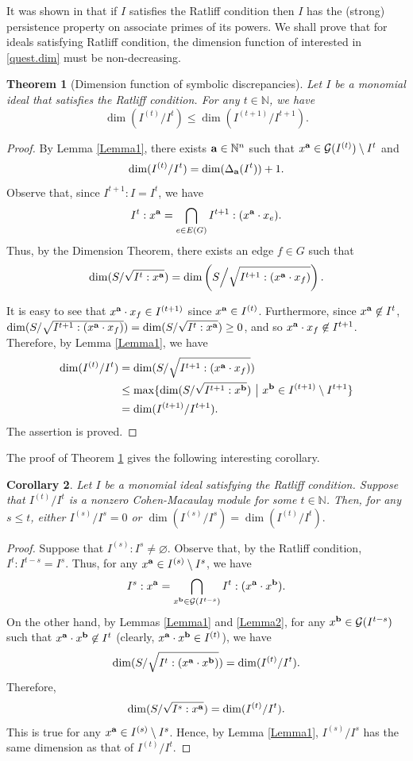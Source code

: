 \documentclass[12pt]{amsart}
\numberwithin{equation}{section}
\newtheorem{theorem}{Theorem}[section]
\newtheorem{corollary}[theorem]{Corollary}
\theoremstyle{definition}
\theoremstyle{definition}
\newcommand{\NN}{{\mathbb N}}
\def\a{{\bold a}}
\def\b{{\bold b}}
\def\G{\mathcal{G}}
\begin{document}
It was shown in \cite{HQ2014} that if $I$ satisfies the Ratliff condition then $I$ has the (strong) persistence property on associate primes of its powers. We shall prove that for ideals satisfying Ratliff condition, the dimension function of interested in \ref{quest.dim} must be non-decreasing.

\begin{theorem}[Dimension function of symbolic discrepancies] \label{thm.dimIncrease} 
	Let $I$ be a monomial ideal that satisfies the Ratliff condition. For any $t \in \NN$, we have
	$$\dim(I^{(t)}/I^t)\le\dim(I^{(t+1)}/I^{t+1}).$$ 
\end{theorem}

\begin{proof} By Lemma \ref{Lemma1}, there exists $\a\in\NN^n$ such that 
	$x^\a\in \G(I^{(t)})\setminus I^t$ and $$\dim(I^{(t)}/I^t)=\dim(\Delta_\a(I^t))+1.$$ 
	Observe that, since $I^{t+1}:I=I^{t}$, we have
	$$I^t:x^\a=\bigcap_{e\in E(G)} I^{t+1}: (x^\a\cdot x_e).$$
	Thus, by the Dimension Theorem, there exists an edge $f\in G$ such that
	$$\dim(S/\sqrt{I^t:x^\a})=\dim\left(S\Big/\sqrt{I^{t+1}:(x^\a\cdot x_f)}\right).$$ 
	
	
	It is easy to see that $x^\a\cdot x_f \in I^{(t+1)}$ since $x^\a \in I^{(t)}$. Furthermore, since $x^\a \not\in I^t$, $\dim(S/\sqrt{I^{t+1} : (x^\a \cdot x_f)}) = \dim (S/\sqrt{I^t: x^\a}) \ge 0$, and so $x^\a \cdot x_f \not\in I^{t+1}$. Therefore, by Lemma \ref{Lemma1}, we have
	\begin{align*} 
		\dim(I^{(t)}/I^t) & = \dim(S/\sqrt{I^{t+1}: (x^\a \cdot x_f)}) \\
		& \le \max\{\dim(S/\sqrt{I^{t+1}: x^\b}) ~\big|~ x^\b \in I^{(t+1)} \setminus I^{t+1} \} \\
		& = \dim (I^{(t+1)}/I^{t+1}).
		\end{align*}
	The assertion is proved. 
\end{proof}

The proof of Theorem \ref{thm.dimIncrease} gives the following interesting corollary.

\begin{corollary}
	\label{cor.CM}
	Let $I$ be a monomial ideal satisfying the Ratliff condition. Suppose that $I^{(t)}/I^t$ is a nonzero Cohen-Macaulay module for some $t \in \NN$. Then, for any $s \le t$, either $I^{(s)}/I^s = 0$ or $\dim (I^{(s)}/I^s) = \dim(I^{(t)}/I^t).$
\end{corollary}

\begin{proof}
	Suppose that $I^{(s)} : I^s \not= \varnothing$. Observe that, by the Ratliff condition, $I^t : I^{t-s} = I^s$. Thus, for any $x^\a \in I^{(s)} \setminus I^s$, we have
	$$I^s : x^\a = \bigcap_{x^\b \in \G(I^{t-s})} I^t : (x^\a \cdot x^\b).$$
	On the other hand, by Lemmas \ref{Lemma1} and \ref{Lemma2}, for any $x^\b \in \G(I^{t-s})$ such that $x^\a \cdot x^\b \not\in I^t$ (clearly, $x^\a \cdot x^\b \in I^{(t)}$), we have
	$$\dim(S/\sqrt{I^t: (x^\a \cdot x^\b)}) = \dim(I^{(t)}/I^t).$$
	Therefore, 
	$$\dim (S/\sqrt{I^s : x^\a}) = \dim(I^{(t)}/I^t).$$
	This is true for any $x^\a \in I^{(s)} \setminus I^s$. Hence, by Lemma \ref{Lemma1}, $I^{(s)}/I^s$ has the same dimension as that of $I^{(t)}/I^t$.
\end{proof}
\end{document}
